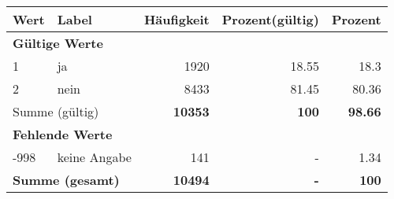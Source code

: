      \begin{longtable}{lXrrr}
     \toprule
     \textbf{Wert} & \textbf{Label} & \textbf{Häufigkeit} & \textbf{Prozent(gültig)} & \textbf{Prozent} \\
     \endhead
     \midrule
     \multicolumn{5}{l}{\textbf{Gültige Werte}}\\

     1 &
     \multicolumn{1}{X}{ ja   } &


       \num{1920} &
       \num[round-mode=places,round-precision=2]{18.55} &
         \num[round-mode=places,round-precision=2]{18.3} \\

     2 &
     \multicolumn{1}{X}{ nein   } &


       \num{8433} &
       \num[round-mode=places,round-precision=2]{81.45} &
         \num[round-mode=places,round-precision=2]{80.36} \\
     \midrule
     \multicolumn{2}{l}{Summe (gültig)} &
       \textbf{\num{10353}} &
     \textbf{\num{100}} &
       \textbf{\num[round-mode=places,round-precision=2]{98.66}} \\
     \multicolumn{5}{l}{\textbf{Fehlende Werte}}\\
       -998 &
       keine Angabe &
         \num{141} &
        - &
         \num[round-mode=places,round-precision=2]{1.34} \\
     \midrule
     \multicolumn{2}{l}{\textbf{Summe (gesamt)}} &
          \textbf{\num{10494}} &
        \textbf{-} &
        \textbf{\num{100}} \\
     \bottomrule
     \end{longtable}
     
